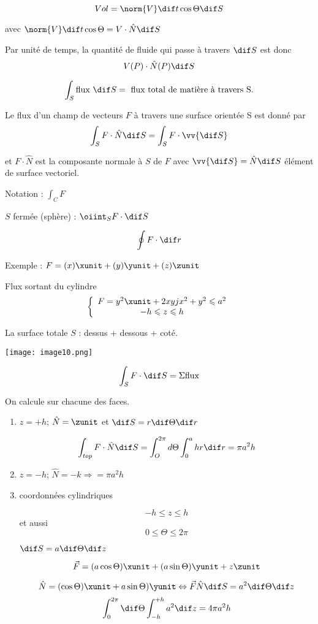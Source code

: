  \[Vol = \norm{V}\dif t \cos \Theta \dif S\]

 avec $\norm{V}\dif t \cos \Theta = V\cdot \hat N \dif S$


 Par unité de temps, la quantité de fluide qui passe à travers $\dif S$ est donc \[V(P) \cdot \hat N(P) \dif S\]

 \[\int_S \text{flux } \dif S = \text{ flux total de matière à travers S.}\]

 \begin{mydef}
 Le flux d'un champ de vecteurs $F$ à travers une surface orientée S est donné par\[\int_S F \cdot \hat N \dif S = \int_S F \cdot \vv{\dif S}\]

 et $F \cdot \hat N$ est la composante normale à $S$ de $F$ avec $\vv{\dif S} = \hat N \dif S$ élément de surface vectoriel.

 Notation : $\int_C F$
 \end{mydef}

\begin{myrem}

$S$ fermée (sphère) :  $ \oiint_S F\cdot \dif S$

\[\oint F\cdot \dif r\]

\end{myrem}

Exemple : $F = (x) \xunit + (y) \yunit+(z) \zunit$

Flux sortant du cylindre
\[\left\{
\begin{array}{c}
F=y^2\xunit+2xyjx^2+y^2\leqslant a^2 \\ %
-h\leqslant z \leqslant h
\end{array}
\right.\]


La surface totale $S$ : dessus + dessous + coté.

\texttt{[image: image10.png]}

\[\int_S F\cdot \dif S = \Sigma\text{flux}\]

On calcule sur chacune des faces.

\begin{enumerate}
  \item
    $z = +h$; $\hat N = \zunit$ et  $\dif S= r\dif\Theta \dif r$

    \[\int_{top}F\cdot \hat N \dif S = \int_O^{2\pi} d\Theta \int_0^a h r \dif r = \pi a^2 h\]

  \item $z = -h$; $\hat N = -k \Rightarrow =\pi a^2 h $

  \item coordonnées cylindriques

    \[-h \leq z\leq h \] et aussi
    \[0\leq \Theta \leq 2 \pi\]

    $\dif S = a\dif \Theta \dif z$

    \[\vec{F} = (a\cos\Theta ) \xunit +(a\sin\Theta ) \yunit + z \zunit  \]

    \[\hat N = (\cos\Theta ) \xunit +a\sin\Theta ) \yunit\Leftrightarrow \vec F \hat N \dif S = a^2\dif \Theta \dif z\]
    \[\int_0^{2\pi} \dif \Theta \int_{-h}^{+h} a^2 \dif z = 4\pi a^2 h\]

\end{enumerate}

